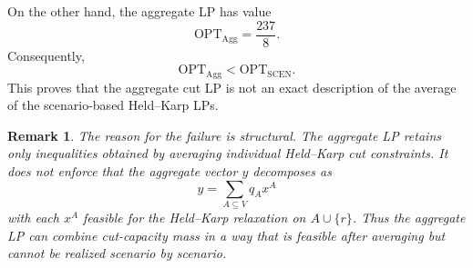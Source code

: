 \documentclass[11pt]{article}
\newtheorem{remark}{Remark}
\newcommand{\OPT}{\mathrm{OPT}}
\newcommand{\Agg}{\mathrm{Agg}}
\begin{document}
On the other hand, the aggregate LP has value
\[
\OPT_{\Agg}=\frac{237}{8}.
\]
Consequently,
\[
\OPT_{\Agg}<\OPT_{\mathrm{SCEN}}.
\]
This proves that the aggregate cut LP is not an exact description of the average of the scenario-based Held--Karp LPs.

\begin{remark}
The reason for the failure is structural. The aggregate LP retains only inequalities obtained by averaging individual Held--Karp cut constraints. It does not enforce that the aggregate vector $y$ decomposes as
\[
y=\sum_{A\subseteq V}q_Ax^A
\]
with each $x^A$ feasible for the Held--Karp relaxation on $A\cup\{r\}$. Thus the aggregate LP can combine cut-capacity mass in a way that is feasible after averaging but cannot be realized scenario by scenario.
\end{remark}
\end{document}

